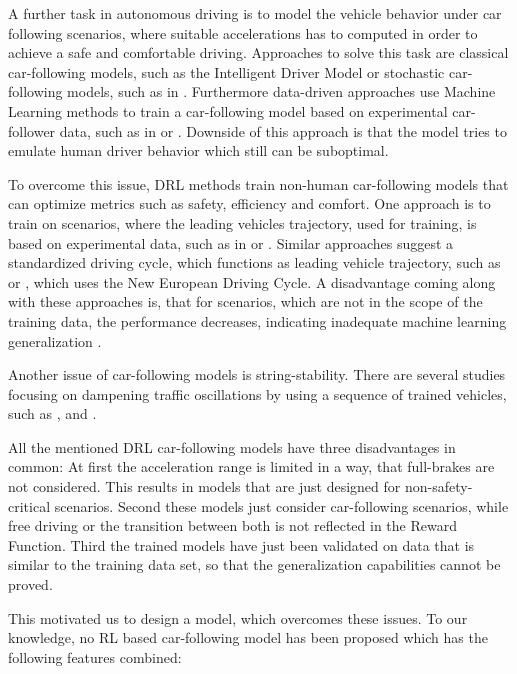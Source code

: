 \documentclass[review]{elsarticle}
\begin{document}
A further task in autonomous driving is to model the vehicle behavior under car following scenarios, where suitable accelerations has to computed in order to achieve a safe and comfortable driving. Approaches to solve this task are classical car-following models, such as the Intelligent Driver Model \cite{Opus} or stochastic car-following models, such as in \cite{Treiber2018stochIDM_TRB}. Furthermore data-driven approaches use Machine Learning methods to train a car-following model based on experimental car-follower data, such as in \cite{Chong2011SimulationOD} or \cite{ZHOU2017245}. Downside of this approach is that the model tries to emulate human driver behavior which still can be suboptimal.

To overcome this issue, DRL methods train non-human car-following models that can optimize metrics such as safety, efficiency and comfort. 
One approach is to train on scenarios, where the leading vehicles trajectory, used for training, is based on experimental data, such as in \cite{SafeEfficientAndComfortable} or \cite{HumanLikeAutonomouCF}. Similar approaches suggest a standardized driving cycle, which functions as leading vehicle trajectory, such as \cite{ComparisonRLvsMPC} or \cite{CFelectricVehicle}, which uses the New European Driving Cycle.
A disadvantage coming along with these approaches is, that for scenarios, which are not in the scope of the training data, the performance decreases, indicating inadequate machine learning generalization \cite{ComparisonRLvsMPC}. 

Another issue of car-following models is string-stability. There are several studies focusing on dampening traffic oscillations by using a sequence of trained vehicles, such as \cite{qu2020jointly}, \cite{DissipatingStopAndGoWaves} and \cite{DampenStopAndGoTraffic}.

All the mentioned DRL car-following models have three disadvantages in common: At first the acceleration range is limited in a way, that full-brakes are not considered. This results in models that are just designed for non-safety-critical scenarios. Second these models just consider car-following scenarios, while free driving or the transition between both is not reflected in the Reward Function. Third the trained models have just been validated on data that is similar to the training data set, so that the generalization capabilities cannot be proved. 

This motivated us to design a model, which overcomes these issues.
To our knowledge, no RL based car-following model has been proposed which has the following features combined:
\end{document}
